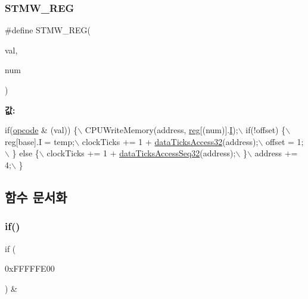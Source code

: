 \subsubsection{\texorpdfstring{S\+T\+M\+W\+\_\+\+R\+EG}{STMW\_REG}\hspace{0.1cm}{\footnotesize\ttfamily [2/2]}}
{\footnotesize\ttfamily \#define S\+T\+M\+W\+\_\+\+R\+EG(\begin{DoxyParamCaption}\item[{}]{val,  }\item[{}]{num }\end{DoxyParamCaption})}

{\bfseries 값\+:}
\begin{DoxyCode}
\textcolor{keywordflow}{if}(\mbox{\hyperlink{arm-new_8h_a4fc220098f4b9d0e039a28274d05c198}{opcode}} & (val)) \{\(\backslash\)
    CPUWriteMemory(address, \mbox{\hyperlink{_g_b_a_8h_ae29faba89509024ffd1a292badcedf2d}{reg}}[(num)].\mbox{\hyperlink{arm-new_8h_a782b7c7c9a56a2031f6270eac7f000d6}{I}});\(\backslash\)
    if(!offset) \{\(\backslash\)
      reg[base].I = temp;\(\backslash\)
      clockTicks += 1 + \mbox{\hyperlink{_g_b_a_8cpp_ac863611762e3e5f63cd5babe38b2fcc7}{dataTicksAccess32}}(address);\(\backslash\)
      offset = 1;\(\backslash\)
    \} \textcolor{keywordflow}{else} \{\(\backslash\)
      clockTicks += 1 + \mbox{\hyperlink{_g_b_a_8cpp_a7f6f2734b76f7d8031fc2ffc5673aa74}{dataTicksAccessSeq32}}(address);\(\backslash\)
    \}\(\backslash\)
    address += 4;\(\backslash\)
  \}
\end{DoxyCode}


\subsection{함수 문서화}
\mbox{\label{arm-new_8h_a93120066fd6daa54150af823953378d1}} 
\subsubsection{\texorpdfstring{if()}{if()}\hspace{0.1cm}{\footnotesize\ttfamily [1/3]}}
{\footnotesize\ttfamily if (\begin{DoxyParamCaption}\item[{\mbox{\hyperlink{_g_b_a_8cpp_a74b6e155b69495625690638f2713fc4a}{bus\+Prefetch\+Count}} \&}]{0x\+F\+F\+F\+F\+F\+E00 }\end{DoxyParamCaption}) \&\hspace{0.3cm}{\ttfamily [pure virtual]}}

